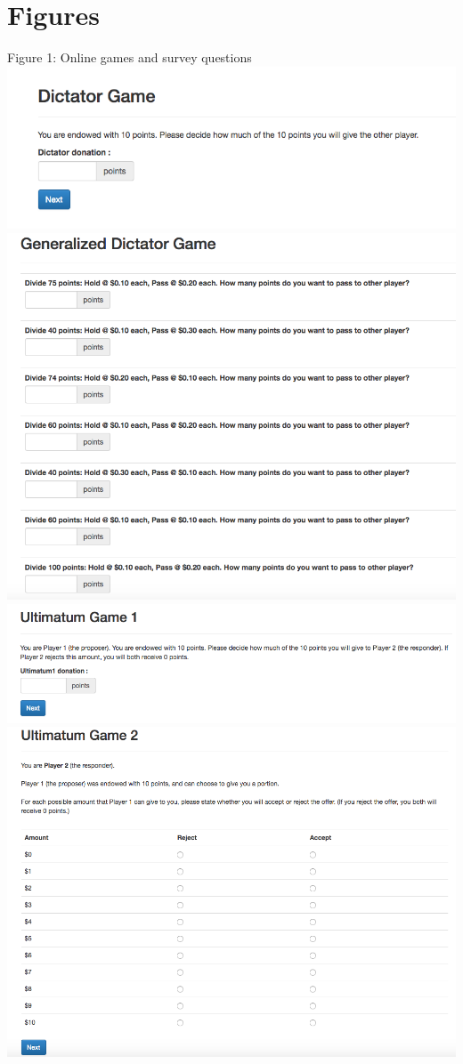 \documentclass{article}
\begin{document}
\section{Figures}
Figure 1: Online games and survey questions \\
\includegraphics[scale=0.5]{dictator} \\
\includegraphics[scale=0.5]{generalized_dictator} \\
\includegraphics[scale=0.5]{ultimatum1} \\
\includegraphics[scale=0.5]{ultimatum2} \\
\end{document}
